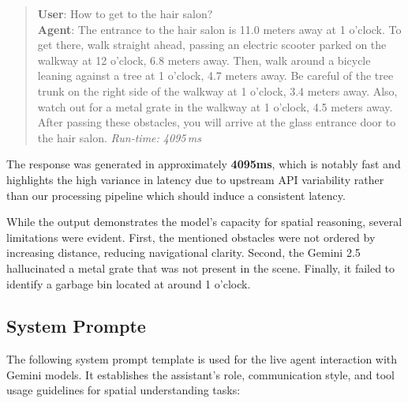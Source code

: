 \begin{quote}
\textbf{User}: How to get to the hair salon?\\
\textbf{Agent}: The entrance to the hair salon is 11.0 meters away at 1 o'clock. To get there, walk straight ahead, passing an electric scooter parked on the walkway at 12 o'clock, 6.8 meters away. Then, walk around a bicycle leaning against a tree at 1 o'clock, 4.7 meters away. Be careful of the tree trunk on the right side of the walkway at 1 o'clock, 3.4 meters away. Also, watch out for a metal grate in the walkway at 1 o'clock, 4.5 meters away. After passing these obstacles, you will arrive at the glass entrance door to the hair salon.
\hfill\textit{Run-time: 4095\,ms}
\end{quote}

The response was generated in approximately \textbf{4095ms}, which is notably fast and highlights the high variance in latency due to upstream API variability rather than our processing pipeline which should induce a consistent latency.

While the output demonstrates the model's capacity for spatial reasoning, several limitations were evident. First, the mentioned obstacles were not ordered by increasing distance, reducing navigational clarity. Second, the Gemini 2.5 hallucinated a metal grate that was not present in the scene. Finally, it failed to identify a garbage bin located at around 1 o'clock.\\


\subsection{System Prompte}

The following system prompt template is used for the live agent interaction with Gemini models. It establishes the assistant's role, communication style, and tool usage guidelines for spatial understanding tasks:

